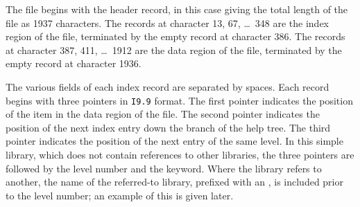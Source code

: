 \documentclass[11pt,nolof]{starlink}
\providecommand{\qt}[1]{``{\tt{#1}}''}
\providecommand{\fstring}[1]{\hbox{\hspace{0.05em}{\qt{#1}}\hspace{0.05em}}}
\begin{document}
The file begins with the header record, in this case giving the
total length of the file as 1937 characters.
The records at character 13, 67, \ldots\ 348 are the index
region of the file, terminated by the empty record at character 386.
The records at character 387, 411, \ldots\ 1912 are the
data region of the file, terminated by the
empty record at character 1936.

The various fields of each index record are separated by spaces.
Each record begins with three pointers in \texttt{I9.9} format.
The first pointer indicates the position of
the item in the data region of the file.  The second pointer
indicates the position of
the next index entry down the branch of the help tree.  The
third pointer indicates the position of the next entry of the
same level.
In this simple library, which does not contain references to
other libraries, the three pointers are followed by the
level number and the keyword.  Where the library refers to
another, the name of the referred-to library, prefixed with an \fstring{@},
is included prior to the level number;  an example of this is
given later.
\end{document}
